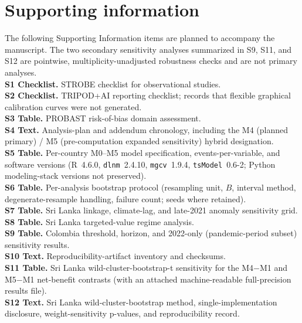 \documentclass[11pt,a4paper]{article}
\begin{document}
\section*{Supporting information}
\begingroup{}
\noindent The following Supporting Information items are planned to accompany the manuscript. The two secondary sensitivity analyses summarized in S9, S11, and S12 are pointwise, multiplicity-unadjusted robustness checks and are not primary analyses.\\[0.4em]
\noindent\textbf{S1 Checklist.} STROBE checklist for observational studies.\\
\textbf{S2 Checklist.} TRIPOD+AI reporting checklist; records that flexible graphical calibration curves were not generated.\\
\textbf{S3 Table.} PROBAST risk-of-bias domain assessment.\\
\textbf{S4 Text.} Analysis-plan and addendum chronology, including the M4 (planned primary) / M5 (pre-computation expanded sensitivity) hybrid designation.\\
\textbf{S5 Table.} Per-country M0--M5 model specification, events-per-variable, and software versions (R~4.6.0, \texttt{dlnm}~2.4.10, \texttt{mgcv}~1.9.4, \texttt{tsModel}~0.6-2; Python modeling-stack versions not preserved).\\
\textbf{S6 Table.} Per-analysis bootstrap protocol (resampling unit, $B$, interval method, degenerate-resample handling, failure count; seeds where retained).\\
\textbf{S7 Table.} Sri Lanka linkage, climate-lag, and late-2021 anomaly sensitivity grid.\\
\textbf{S8 Table.} Sri Lanka targeted-value regime analysis.\\
\textbf{S9 Table.} Colombia threshold, horizon, and 2022-only (pandemic-period subset) sensitivity results.\\
\textbf{S10 Text.} Reproducibility-artifact inventory and checksums.\\
\textbf{S11 Table.} Sri Lanka wild-cluster-bootstrap-t sensitivity for the M4$-$M1 and M5$-$M1 net-benefit contrasts (with an attached machine-readable full-precision results file).\\
\textbf{S12 Text.} Sri Lanka wild-cluster-bootstrap method, single-implementation disclosure, weight-sensitivity p-values, and reproducibility record.
\endgroup
\end{document}
